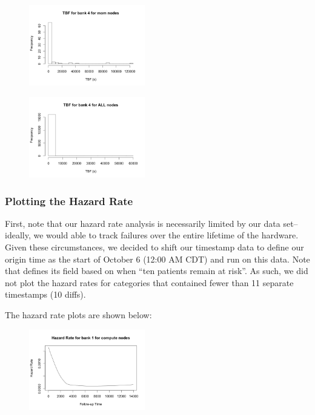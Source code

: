\begin{figure}
\centering
\includegraphics[width=0.45\textwidth]{images/tbf_4_m.png}
\end{figure}

\begin{figure}
\centering
\includegraphics[width=0.45\textwidth]{images/tbf_4_a.png}
\end{figure}

\subsubsection{Plotting the Hazard Rate}

First, note that our hazard rate analysis is necessarily limited by our data set--ideally, we would able to track failures over the entire lifetime of the hardware.  Given these circumstances, we decided to shift our timestamp data to define our origin time as the start of October 6 (12:00 AM CDT) and run  on this data.  Note that  defines its  field based on when ``ten patients remain at risk''\cite{MUHAZ}.  As such, we did not plot the hazard rates for categories that contained fewer than 11 separate timestamps (10 diffs).

The hazard rate plots are shown below:

\begin{figure}
\centering
\includegraphics[width=0.45\textwidth]{images/haz_1_c.png}
\end{figure}

